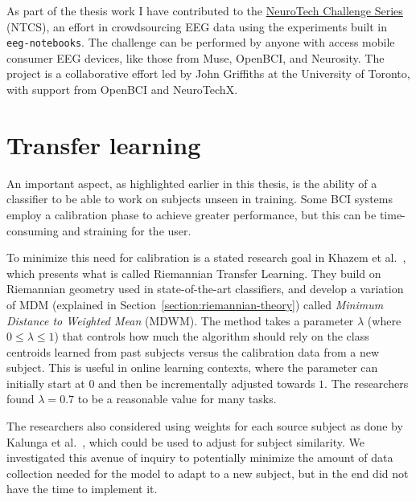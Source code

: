 
    As part of the thesis work I have contributed to the \href{https://neurotech-challenge.com/}{NeuroTech Challenge Series} (NTCS), an effort in crowdsourcing EEG data using the experiments built in \texttt{eeg-notebooks}. The challenge can be performed by anyone with access mobile consumer EEG devices, like those from Muse, OpenBCI, and Neurosity\@. The project is a collaborative effort led by John Griffiths at the University of Toronto, with support from OpenBCI and NeuroTechX.\label{section:ntcs}


\section{Transfer learning}\label{section:transfer-learning}

An important aspect, as highlighted earlier in this thesis, is the ability of a classifier to be able to work on subjects unseen in training. Some BCI systems employ a calibration phase to achieve greater performance, but this can be time-consuming and straining for the user.

To minimize this need for calibration is a stated research goal in Khazem et al.~\cite{khazem_minimizing_2021}, which presents what is called Riemannian Transfer Learning. They build on Riemannian geometry used in state-of-the-art classifiers, and develop a variation of MDM (explained in Section~\ref{section:riemannian-theory}) called \emph{Minimum Distance to Weighted Mean} (MDWM). The method takes a parameter $\lambda$ (where $0 \leq \lambda \leq 1$) that controls how much the algorithm should rely on the class centroids learned from past subjects versus the calibration data from a new subject. This is useful in online learning contexts, where the parameter can initially start at $0$ and then be incrementally adjusted towards $1$. The researchers found $\lambda = 0.7$ to be a reasonable value for many tasks. 

The researchers also considered using weights for each source subject as done by Kalunga et al.~\cite{kalunga_transfer_2018}, which could be used to adjust for subject similarity. We investigated this avenue of inquiry to potentially minimize the amount of data collection needed for the model to adapt to a new subject, but in the end did not have the time to implement it.

